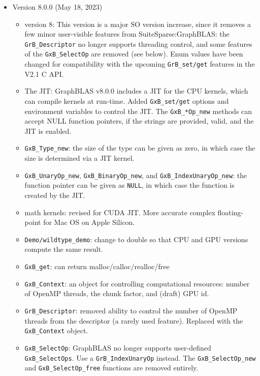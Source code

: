 \documentclass[12pt]{article}
\begin{document}
\begin{itemize}
\item Version 8.0.0 (May 18, 2023)

    \begin{itemize}
    \item version 8:  This version is a major SO version increase, since
        it removes a few minor user-visible features from
        SuiteSparse:GraphBLAS: the \verb'GrB_Descriptor' no longer supports
        threading control, and some features of the \verb'GxB_SelectOp' are
        removed (see below).  Enum values have been changed for compatibility
        with the upcoming \verb'GrB_set/get' features in the V2.1 C API.
    \item The JIT:  GraphBLAS v8.0.0 includes a JIT for the CPU kernels,
        which can compile kernels at run-time.  Added \verb'GxB_set/get'
        options and environment variables to control the JIT.  The
        \verb'GxB_*Op_new' methods can accept NULL function pointers, if the
        strings are provided, valid, and the JIT is enabled.
    \item \verb'GxB_Type_new': the size of the type can be given as zero,
        in which case the size is determined via a JIT kernel.
    \item \verb'GxB_UnaryOp_new', \verb'GxB_BinaryOp_new', and
        \verb'GxB_IndexUnaryOp_new': the function pointer can be given as
        \verb'NULL', in which case the function is created by the JIT.
    \item math kernels: revised for CUDA JIT.  More accurate complex
        floating-point for Mac OS on Apple Silicon.
    \item \verb'Demo/wildtype_demo': change to double so that CPU and GPU
        versions compute the same result.
    \item \verb'GxB_get': can return malloc/calloc/realloc/free
    \item \verb'GxB_Context':
        an object for controlling computational resources:
        number of OpenMP threads, the chunk factor, and (draft) GPU id.
    \item \verb'GrB_Descriptor':
        removed ability to control the number of OpenMP threads from the
        descriptor (a rarely used feature).  Replaced with the
        \verb'GxB_Context' object.
    \item \verb'GxB_SelectOp': GraphBLAS no longer supports
        user-defined \verb'GxB_SelectOps'.  Use a \verb'GrB_IndexUnaryOp'
        instead.  The \verb'GxB_SelectOp_new' and
        \verb'GxB_SelectOp_free' functions are removed entirely.

\end{itemize}
\end{itemize}
\end{document}
